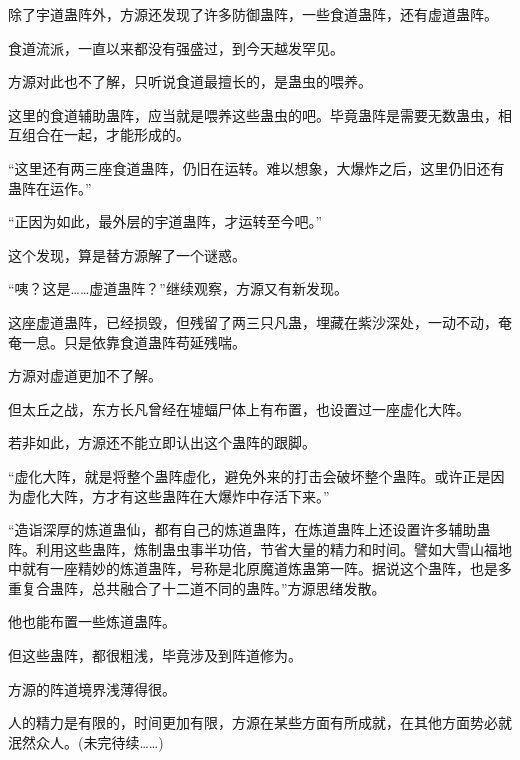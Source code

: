 \begin{this_body}
除了宇道蛊阵外，方源还发现了许多防御蛊阵，一些食道蛊阵，还有虚道蛊阵。

食道流派，一直以来都没有强盛过，到今天越发罕见。

方源对此也不了解，只听说食道最擅长的，是蛊虫的喂养。

这里的食道辅助蛊阵，应当就是喂养这些蛊虫的吧。毕竟蛊阵是需要无数蛊虫，相互组合在一起，才能形成的。

“这里还有两三座食道蛊阵，仍旧在运转。难以想象，大爆炸之后，这里仍旧还有蛊阵在运作。”

“正因为如此，最外层的宇道蛊阵，才运转至今吧。”

这个发现，算是替方源解了一个谜惑。

“咦？这是……虚道蛊阵？”继续观察，方源又有新发现。

这座虚道蛊阵，已经损毁，但残留了两三只凡蛊，埋藏在紫沙深处，一动不动，奄奄一息。只是依靠食道蛊阵苟延残喘。

方源对虚道更加不了解。

但太丘之战，东方长凡曾经在墟蝠尸体上有布置，也设置过一座虚化大阵。

若非如此，方源还不能立即认出这个蛊阵的跟脚。

“虚化大阵，就是将整个蛊阵虚化，避免外来的打击会破坏整个蛊阵。或许正是因为虚化大阵，方才有这些蛊阵在大爆炸中存活下来。”

“造诣深厚的炼道蛊仙，都有自己的炼道蛊阵，在炼道蛊阵上还设置许多辅助蛊阵。利用这些蛊阵，炼制蛊虫事半功倍，节省大量的精力和时间。譬如大雪山福地中就有一座精妙的炼道蛊阵，号称是北原魔道炼蛊第一阵。据说这个蛊阵，也是多重复合蛊阵，总共融合了十二道不同的蛊阵。”方源思绪发散。

他也能布置一些炼道蛊阵。

但这些蛊阵，都很粗浅，毕竟涉及到阵道修为。

方源的阵道境界浅薄得很。

人的精力是有限的，时间更加有限，方源在某些方面有所成就，在其他方面势必就泯然众人。(未完待续……)

\end{this_body}

